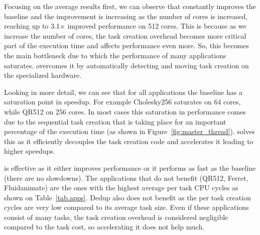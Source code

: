 Focusing on the average results first, we can observe that {\proposal} constantly improves the baseline and the improvement is increasing as the number of cores is increased, reaching up to 3.1$\times$ improved performance on 512 cores. 
This is because as we increase the number of cores, the task creation overhead becomes more critical part of the execution time and affects performance even more.
So, this becomes the main bottleneck due to which the performance of many applications saturates. 
{\proposal} overcomes it by automatically detecting and moving task creation on the specialized hardware.

Looking in more detail, we can see that for all applications the baseline has a saturation point in speedup.
For example Cholesky256 saturates on 64 cores, while QR512 on 256 cores.
In most cases this saturation in performance comes due to the sequential task creation that is taking place for an important percentage of the execution time (as shown in Figure~\ref{fig:master_thread}).
{\proposal} solves this as it efficiently decouples the task creation code and accelerates it leading to higher speedups.

{\proposal} is effective as it either improves performance or it performs as fast as the baseline (there are no slowdowns). 
The applications that do not benefit (QR512, Ferret, Fluidanimate) are the ones with the highest average per task CPU cycles as shown on Table~\ref{tab.apps}.
Dedup also does not benefit as the per task creation cycles are very low compared to its average task size.
Even if these applications consist of many tasks, the task creation overhead is considered negligible compared to the task cost, so accelerating it does not help much. 

%


